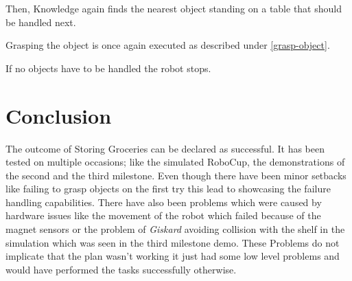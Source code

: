 \documentclass[main.tex]{subfiles}
\begin{document}
	
	\begin{knowledge}
	Then, Knowledge again finds the nearest object standing on a table that should be handled next.
	\end{knowledge}
	
	\begin{manipulation}
	Grasping the object is once again executed as described under \ref{grasp-object}.
	\end{manipulation}
	
	\begin{planning}
	If no objects have to be handled the robot stops.
	\end{planning}
	
	
	\section{Conclusion}

	The outcome of Storing Groceries can be declared as successful. It has been tested on multiple occasions; like the simulated RoboCup, the demonstrations of the second and the third milestone. 
	Even though there have been minor setbacks like failing to grasp objects on the first try this lead to showcasing the failure handling capabilities.
	There have also been problems which were caused by hardware issues like the movement of the robot which failed because of the magnet sensors or the problem of \textit{Giskard} avoiding collision with the shelf in the simulation which was seen in the third milestone demo.
	These Problems do not implicate that the plan wasn't working it just had some low level problems and would have performed the tasks successfully otherwise.
	
	
	\endgroup
	
\end{document}
